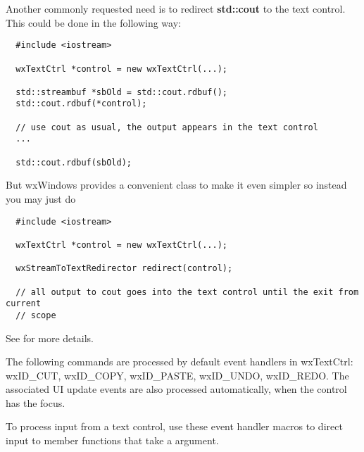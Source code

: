 Another commonly requested need is to redirect {\bf std::cout} to the text
control. This could be done in the following way:

{\small%
\begin{verbatim}
  #include <iostream>

  wxTextCtrl *control = new wxTextCtrl(...);

  std::streambuf *sbOld = std::cout.rdbuf();
  std::cout.rdbuf(*control);

  // use cout as usual, the output appears in the text control
  ...

  std::cout.rdbuf(sbOld);
\end{verbatim}
}%

But wxWindows provides a convenient class to make it even simpler so instead
you may just do

{\small%
\begin{verbatim}
  #include <iostream>

  wxTextCtrl *control = new wxTextCtrl(...);

  wxStreamToTextRedirector redirect(control);

  // all output to cout goes into the text control until the exit from current
  // scope
\end{verbatim}
}%

See  for more
details.


The following commands are processed by default event handlers in wxTextCtrl: wxID\_CUT, wxID\_COPY,
wxID\_PASTE, wxID\_UNDO, wxID\_REDO. The associated UI update events are also processed
automatically, when the control has the focus.

To process input from a text control, use these event handler macros to direct input to member
functions that take a  argument.

\twocolwidtha{7cm}%
\begin{twocollist}\itemsep=0pt
\end{twocollist}%

